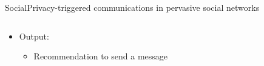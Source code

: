\begin{frame}{Social}{Privacy-triggered communications in pervasive social networks \cite{jadliwala_privacytriggered_2011}}
\begin{columns}
\begin{column}{0.6\textwidth}
\begin{itemize}
\begin{itemize}
					\end{itemize}
					
				\item Output:
					\begin{itemize}
						\item Recommendation to send a message 
					\end{itemize}
					
			\end{itemize}
		\end{column}
	\end{columns}
	

\end{frame}

